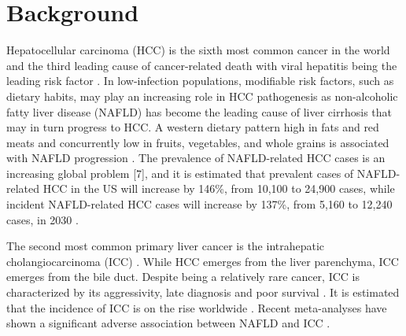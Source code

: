 \documentclass[nutrients,article,submit,moreauthors,pdftex]{Definitions/mdpi}
\begin{document}

\hypertarget{sec1}{%
\section{Background}\label{sec1}}

Hepatocellular carcinoma (HCC) is the sixth most common cancer in the
world and the third leading cause of cancer-related death with viral
hepatitis being the leading risk factor \citep{Massarweh2017}. In
low-infection populations, modifiable risk factors, such as dietary
habits, may play an increasing role in HCC pathogenesis as non-alcoholic
fatty liver disease (NAFLD) has become the leading cause of liver
cirrhosis \citep{Younossi2016, Younossi2020} that may in turn progress
to HCC. A western dietary pattern high in fats and red meats and
concurrently low in fruits, vegetables, and whole grains is associated
with NAFLD progression \citep{Guo2022}. The prevalence of NAFLD-related
HCC cases is an increasing global problem {[}7{]}, and it is estimated
that prevalent cases of NAFLD-related HCC in the US will increase by
146\%, from 10,100 to 24,900 cases, while incident NAFLD-related HCC
cases will increase by 137\%, from 5,160 to 12,240 cases, in 2030
\citep{Estes2018}.

The second most common primary liver cancer is the intrahepatic
cholangiocarcinoma (ICC) \citep{Khan2019}. While HCC emerges from the
liver parenchyma, ICC emerges from the bile duct. Despite being a
relatively rare cancer, ICC is characterized by its aggressivity, late
diagnosis and poor survival \citep{kirstein2016}. It is estimated that
the incidence of ICC is on the rise worldwide \citep{Bergquist2015}.
Recent meta-analyses have shown a significant adverse association
between NAFLD and ICC \citep{Wongjarupong2017, corrao2020}.
\end{document}
